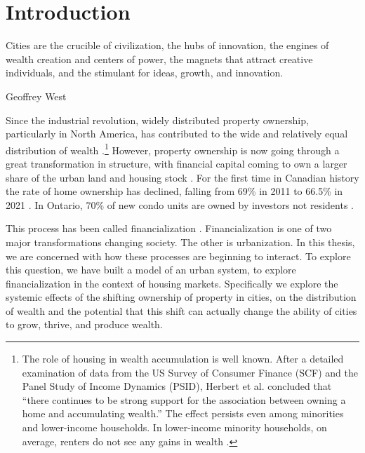 \chapter{Introduction} \label{chapter-introduction}
\epigraph{Cities are the crucible of civilization, the hubs of innovation, the engines of wealth creation and centers of power, the magnets that attract creative individuals, and the stimulant for ideas, growth, and innovation.}{Geoffrey West \cite{westScaleUniversalLaws2017}}

Since the industrial revolution, widely distributed property ownership, particularly in North America, has contributed to the wide and relatively equal distribution of {wealth} \cite{pikettyCapitalTwentyfirstCentury2014, harrisGrowthHomeOwnership1977, chevanGrowthHomeOwnership1989, andrewsEvolutionHomeownershipRates2011}.\footnote{The role of housing in wealth accumulation is well known. After a detailed  examination of data from the US Survey of Consumer Finance (SCF) and the Panel Study of Income Dynamics (PSID), Herbert et al. concluded that ``there continues to be strong support for the association between owning a home and accumulating wealth.'' The effect persists even among minorities and lower-income households. In lower-income minority households, on average, renters do not see any gains in wealth \cite{herbertHomeownershipStillEffective2013}.} However, property ownership is now going through a great transformation in structure, with financial capital coming to own a larger share of the urban land and housing stock \cite{farhaReportFinancializationHousing2017, palleyFinancializationWhatIt2007}. For the first time in Canadian history the rate of home ownership has declined, falling from 69\%  in 2011 to 66.5\% in 2021 \cite{statisticscanadaBuyRentHousing2022}. %
In Ontario, 70\% of new condo units are owned by investors not residents \cite{GET77percent}. 

This process has been called financialization \cite{farhaReportFinancializationHousing2017, hansenFinanceCapitalismFinancialization2014, tomaskovic-deveyFinancializationCausesInequality2013, palleyFinancializationWhatIt2007, seccarecciaUnderstandingFinancializationHistory2013, nemtinFinancializationHousingSocial2021}. Financialization is one of two major transformations changing society. The other is urbanization. In this thesis, we are concerned with how these processes are beginning to interact. To explore this question, we have built a model of an urban system, to explore financialization in the context of housing markets. Specifically we explore the systemic effects of the shifting ownership of property in cities, on the distribution of wealth and the potential that this shift can actually change the ability of cities to grow, thrive, and produce wealth.

